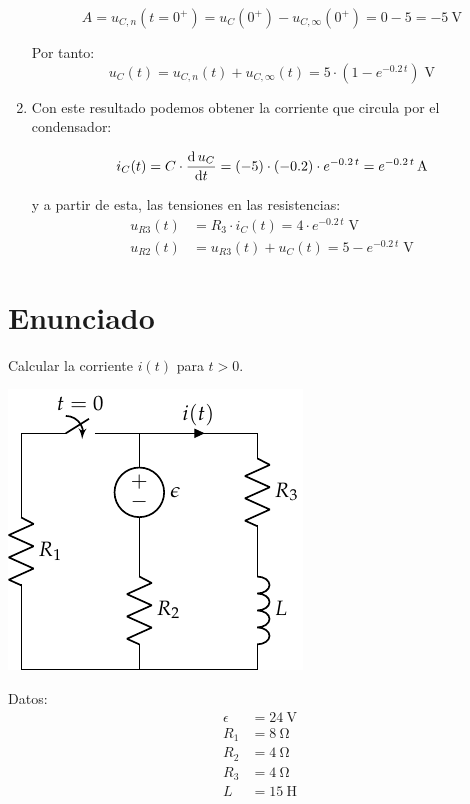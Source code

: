 \begin{enumerate}
\begin{equation*}
  A = u_{C,n}(t=0^+) = u_C(0^+) - u_{C,\infty}(0^+) = 0 - 5 = \qty{-5}{\volt}
\end{equation*}

Por tanto:
\begin{equation*}
  u_C(t) = u_{C,n}(t) + u_{C,\infty}(t) = 5 \cdot (1 - e^{-0.2\, t}) \;\unit{\volt}
\end{equation*}

\vspace{2mm}
\item Con este resultado podemos obtener la corriente que circula por
  el condensador:

\begin{equation*}
  i_C(t) = C \cdot \diff{\,u_C}{t} = (-5)\cdot(-0.2)\cdot e^{-0.2\, t} = e^{-0.2\, t} \,\unit{\ampere}
\end{equation*}

y a partir de esta, las tensiones en las resistencias:
\begin{align*}
  u_{R3}(t) &=  R_3 \cdot i_C(t) = 4 \cdot e^{-0.2\, t} \;\unit{\volt}\\[3pt]
  u_{R2}(t) &=  u_{R3}(t) + u_C(t) = 5 - e^{-0.2\, t} \;\unit{\volt}
\end{align*}
    
  
\end{enumerate}

\section{Enunciado}

Calcular la corriente $i(t)$ para $t > 0$.

\begin{minipage}{0.5\textwidth}
  \includegraphics{figuras/FM_4_2}
\end{minipage}
\hfill
\begin{minipage}{0.5\textwidth}
  Datos:
  \begin{align*}
    \epsilon &= \SI{24}{\volt}\\
    R_1 &= \SI{8}{\ohm}\\
    R_2 &= \SI{4}{\ohm}\\
    R_3 &= \SI{4}{\ohm}\\
    L &= \SI{15}{\henry}
  \end{align*}
\end{minipage}

